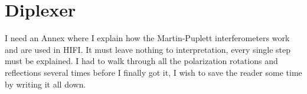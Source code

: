 \chapter{Diplexer}
I need an Annex where I explain how the Martin-Puplett interferometers work and are used in HIFI.  It must leave nothing to interpretation, every single step must be explained.  I had to walk through all the polarization rotations and reflections several times before I finally got it, I wish to save the reader some time by writing it all down.
